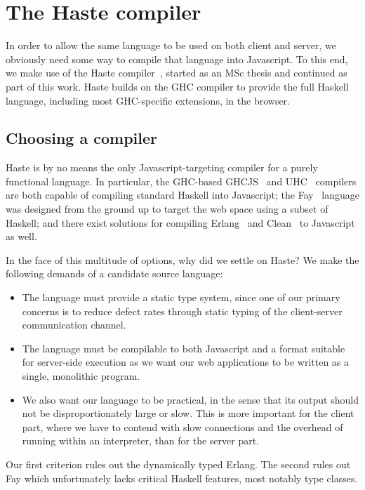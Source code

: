 \documentclass[preprint]{sigplanconf}
\begin{document}
\section{The Haste compiler}\label{sec:haste}

In order to allow the same language to be used on both client and server, we
obviously need some way to compile that language into Javascript. To this end,
we make use of the Haste compiler\ \cite{haste}, started as an MSc thesis and
continued as part of this work. Haste builds on the GHC compiler to provide
the full Haskell language, including most GHC-specific extensions, in the
browser.

\subsection{Choosing a compiler}

Haste is by no means the only Javascript-targeting compiler for a purely
functional language. In particular, the GHC-based GHCJS\ \cite{ghcjs} and
UHC\ \cite{uhc} compilers are both capable of compiling standard Haskell into
Javascript; the Fay\ \cite{fay} language was designed from the ground up to
target the web space using a subset of Haskell; and there exist solutions for
compiling Erlang\ \cite{jserlang} and Clean\ \cite{jsclean} to Javascript as
well.

In the face of this multitude of options, why did we settle on Haste? We make
the following demands of a candidate source language:

\begin{itemize}
  \item The language must provide a static type system, since one of our
        primary concerns is to reduce defect rates through static typing of
        the client-server communication channel.
  \item The language must be compilable to both Javascript and a format
        suitable for server-side execution as we want our web applications
        to be written as a single, monolithic program.
  \item We also want our language to be practical, in the sense that its output
        should not be disproportionately large or slow. This is more important
        for the client part, where we have to contend with slow connections and
        the overhead of running within an interpreter, than for the server part.
\end{itemize}

Our first criterion rules out the dynamically typed Erlang. The second rules
out Fay which unfortunately lacks critical Haskell features, most notably type
classes.
\end{document}
